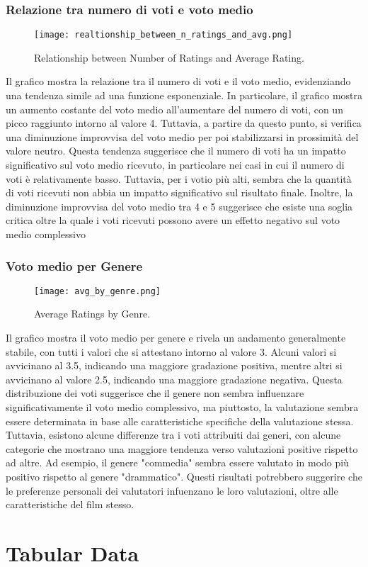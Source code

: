 \documentclass[../../Report.tex]{subfiles}
\begin{document}
\subsubsection{Relazione tra numero di voti e voto medio}
\begin{figure}[H]
    \centering
    \texttt{[image: realtionship\_between\_n\_ratings\_and\_avg.png]}
    \caption{Relationship between Number of Ratings and Average Rating.}
    \label{fig:realtionship_between_n_ratings_and_avg}
\end{figure}
Il grafico mostra la relazione tra il numero di voti e il voto medio, evidenziando una tendenza simile ad una funzione esponenziale.
In particolare, il grafico mostra un aumento costante del voto medio all'aumentare del numero di voti, con un picco raggiunto intorno al valore 4.
Tuttavia, a partire da questo punto, si verifica una diminuzione improvvisa del voto medio per poi stabilizzarsi in prossimità del valore neutro.
Questa tendenza suggerisce che il numero di voti ha un impatto significativo sul voto medio ricevuto, in particolare nei casi in cui il numero di voti è relativamente basso.
Tuttavia, per i votio più alti, sembra che la quantità di voti ricevuti non abbia un impatto significativo sul risultato finale. Inoltre, la diminuzione improvvisa del voto medio tra 4 e 5 suggerisce che esiste una soglia critica oltre la quale i voti ricevuti possono avere un effetto negativo sul voto medio complessivo


\subsubsection{Voto medio per Genere}
\begin{figure}[H]
    \centering
    \texttt{[image: avg\_by\_genre.png]}
    \caption{Average Ratings by Genre.}
    \label{fig:avg_by_genre}
\end{figure}
Il grafico mostra il voto medio per genere e rivela un andamento generalmente stabile, con tutti i valori che si attestano intorno al valore 3.
Alcuni valori si avvicinano al 3.5, indicando una maggiore gradazione positiva, mentre altri si avvicinano al valore 2.5, indicando una maggiore gradazione negativa.
Questa distribuzione dei voti suggerisce che il genere non sembra influenzare significativamente il voto medio complessivo, ma piuttosto, la valutazione sembra essere determinata in base alle caratteristiche specifiche della valutazione stessa.
Tuttavia, esistono alcune differenze tra i voti attribuiti dai generi, con alcune categorie che mostrano una maggiore tendenza verso valutazioni positive rispetto ad altre. 
Ad esempio, il genere "commedia" sembra essere valutato in modo più positivo rispetto al genere "drammatico". 
Questi risultati potrebbero suggerire che le preferenze personali dei valutatori infuenzano le loro valutazioni, oltre alle caratteristiche del film stesso.



\section{Tabular Data}
\end{document}
